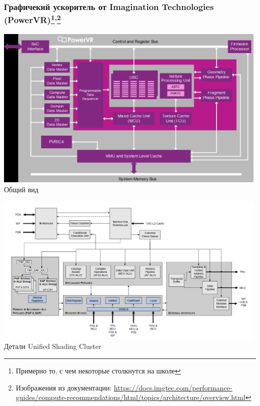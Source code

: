 \documentclass[xcolor=table,aspectratio=169]{beamer}
\begin{document}
\begin{frame}[fragile]
  \frametitle{Графичекий ускоритель от Imagination Technologies (PowerVR)\footnote{Примерно то, с чем некоторые столкнутся на школе}\textsuperscript{,}\footnote{Изображения из документации: \url{https://docs.imgtec.com/performance-guides/compute-recommendations/html/topics/architecture/overview.html}}}
  \begin{minipage}[t]{0.49\textwidth}
    \begin{center}
  \includegraphics[valign=t,width=0.99\textwidth]{pictures/ImTech_Type-3_4-architecture-overview.pdf}\\
  Общий вид
    \end{center}
  \end{minipage}
  \begin{minipage}[t]{0.49\textwidth}
    \begin{center}
  \includegraphics[valign=t,width=0.99\textwidth]{pictures/ImTech_Type-4-architecture-unified-shading-cluster.pdf}\\
  Детали Unified Shading Cluster
\end{center}
\end{minipage}
\end{frame}
\end{document}
